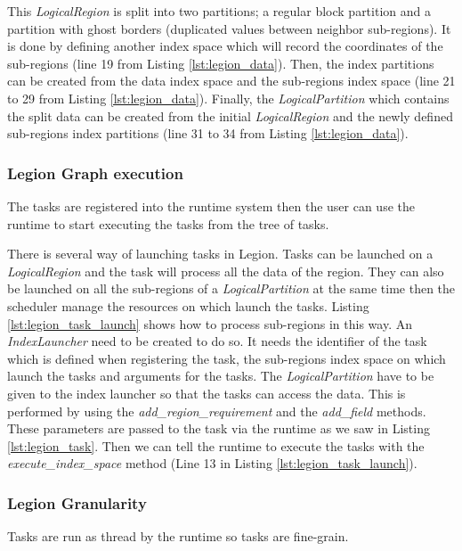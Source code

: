 This \textit{LogicalRegion} is split into two partitions; a regular block partition and a partition with ghost borders (duplicated values between neighbor sub-regions).
It is done by defining another index space which will record the coordinates of the sub-regions (line 19 from Listing \ref{lst:legion_data}).
Then, the index partitions can be created from the data index space and the sub-regions index space (line 21 to 29 from Listing \ref{lst:legion_data}).
Finally, the \textit{LogicalPartition} which contains the split data can be created from the initial \textit{LogicalRegion} and the newly defined sub-regions index partitions (line 31 to 34 from Listing \ref{lst:legion_data}).


\subsubsection{Legion Graph execution}
The tasks are registered into the runtime system then the user can use the runtime to start executing the tasks from the tree of tasks.



There is several way of launching tasks in Legion.
Tasks can be launched on a \textit{LogicalRegion} and  the task will process all the data of the region.
They can also be launched on all the sub-regions of a \textit{LogicalPartition} at the same time then the scheduler manage the resources on which launch the tasks.
Listing \ref{lst:legion_task_launch} shows how to process sub-regions in this way.
An \textit{IndexLauncher} need to be created to do so.
It needs the identifier of the task which is defined when registering the task, the sub-regions index space on which launch the tasks and arguments for the tasks.
The \textit{LogicalPartition} have to be given to the index launcher so that the tasks can access the data.
This is performed by using the \textit{add\_region\_requirement} and the \textit{add\_field} methods.
These parameters are passed to the task via the runtime as we saw in Listing \ref{lst:legion_task}.
Then we can tell the runtime to execute the tasks with the \textit{execute\_index\_space} method (Line 13 in Listing \ref{lst:legion_task_launch}).

\subsubsection{Legion Granularity}
Tasks are run as thread by the runtime so tasks are fine-grain.

